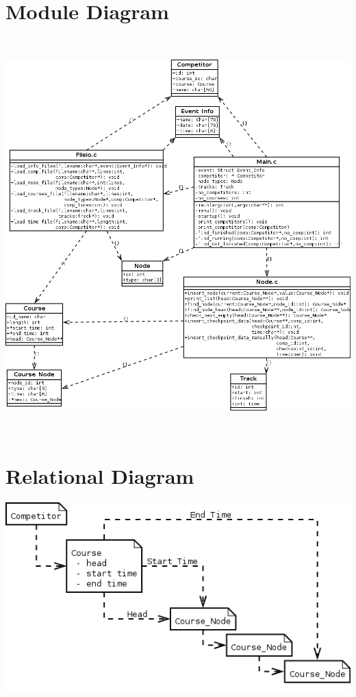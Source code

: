 \documentclass{article}
\begin{document}
\begin{appendices}
	\section{Module Diagram}
	\hspace{-1in}
	\includegraphics[height=6in,width=6.75in]{../diagrams/module-diagram.png}
	\newpage
	\hspace{-1in}
	\section{Relational Diagram}
	\includegraphics[scale=0.75]{../diagrams/description-of-inheritance.png}
\end{appendices}
\end{document}
